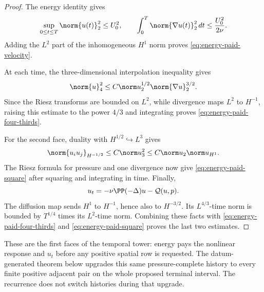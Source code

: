 \begin{proof}
The energy identity gives
\[
 \sup_{0\le t\le T}\norm{u(t)}_2^2\le U_0^2,
 \qquad
 \int_0^T\norm{\nabla u(t)}_2^2\,dt
 \le\frac{U_0^2}{2\nu}.
\]
Adding the \(L^2\) part of the inhomogeneous \(H^1\) norm proves
\eqref{eq:energy-paid-velocity}.

At each time, the three-dimensional interpolation inequality gives
\[
 \norm{u}_4^2
 \le C\norm u_2^{1/2}\norm{\nabla u}_2^{3/2}.
\]
Since the Riesz transforms are bounded on \(L^2\), while divergence maps
\(L^2\) to \(H^{-1}\), raising this estimate to the power \(4/3\) and
integrating proves \eqref{eq:energy-paid-four-thirds}.

For the second face, duality with
\(H^{1/2}\hookrightarrow L^3\) gives
\[
 \norm{u_i u_j}_{H^{-1/2}}
 \le C\norm u_3^2
 \le C\norm u_2\norm u_{H^1}.
\]
The Riesz formula for pressure and one divergence now give
\eqref{eq:energy-paid-square} after squaring and integrating in time.
Finally,
\[
 u_t=-\nu\PP(-\Delta)u-\mathcal Q(u,p).
\]
The diffusion map sends \(H^1\) to \(H^{-1}\), hence also to
\(H^{-3/2}\).  Its \(L^{4/3}\)-time norm is bounded by
\(T^{1/4}\) times its \(L^2\)-time norm.  Combining these facts with
\eqref{eq:energy-paid-four-thirds} and
\eqref{eq:energy-paid-square} proves the last two estimates.
\end{proof}

These are the first faces of the temporal tower: energy pays the nonlinear
response and \(u_t\) before any positive spatial row is requested.  The
datum-generated theorem below upgrades this same pressure-complete history
to every finite positive adjacent pair on the whole proposed terminal
interval.  The recurrence does not switch histories during that upgrade.

